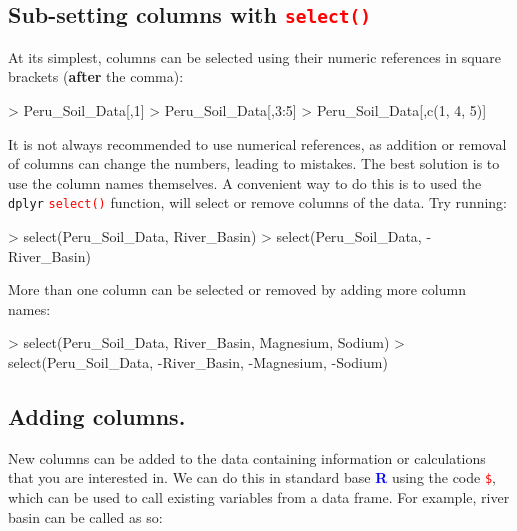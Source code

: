 \documentclass[a4paper,12pt]{article}
\newcommand\boldblue[1]{\textcolor{blue}{\textbf{#1}}}
\newcommand\code[1]{\textcolor{red}{\texttt{#1}}}
\begin{document}
\subsection{Sub-setting columns with \code{select()}}

At its simplest, columns can be selected using their numeric references in square brackets (\textbf{after} the comma):

\begin{shaded}
\begin{Schunk}
\begin{Sinput}
> Peru_Soil_Data[,1]
> Peru_Soil_Data[,3:5]
> Peru_Soil_Data[,c(1, 4, 5)]
\end{Sinput}
\end{Schunk}
\end{shaded}

It is not always recommended to use numerical references, as addition or removal of columns can change the numbers, leading to mistakes. The best solution is to use the column names themselves. A convenient way to do this is to used the \texttt{dplyr} \code{select()} function, will select or remove columns of the data. Try running:

\begin{shaded}
\begin{Schunk}
\begin{Sinput}
> select(Peru_Soil_Data, River_Basin)
> select(Peru_Soil_Data, -River_Basin)
\end{Sinput}
\end{Schunk}
\end{shaded}

More than one column can be selected or removed by adding more column names:

\begin{shaded}
\begin{Schunk}
\begin{Sinput}
> select(Peru_Soil_Data, River_Basin, Magnesium, Sodium)
> select(Peru_Soil_Data, -River_Basin, -Magnesium, -Sodium)
\end{Sinput}
\end{Schunk}
\end{shaded}

\subsection{Adding columns.}

New columns can be added to the data containing information or calculations that you are interested in. We can do this in standard base \boldblue{R} using the code \code{\$}, which can be used to call existing variables from a data frame. For example, river basin can be called as so:
\end{document}
